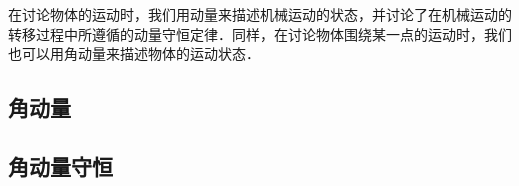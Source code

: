 
\begin{issues}
\issueTODO
\end{issues}

在讨论物体的运动时，我们用动量来描述机械运动的状态，并讨论了在机械运动的转移过程中所遵循的动量守恒定律．同样，在讨论物体围绕某一点的运动时，我们也可以用角动量来描述物体的运动状态．
\subsection{角动量}

\subsection{角动量守恒}



